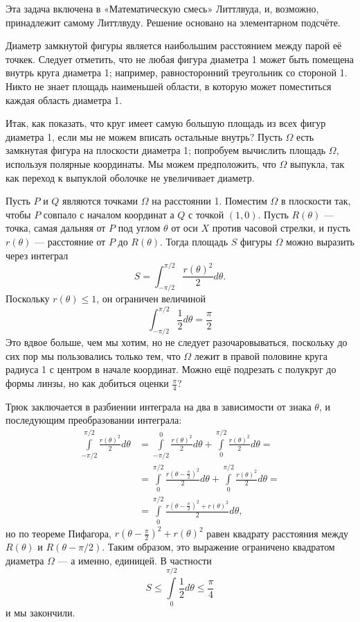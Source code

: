 Эта задача включена в «Математическую смесь» Литтлвуда, и, возможно, принадлежит самому Литтлвуду.
Решение основано на элементарном подсчёте. %

Диаметр замкнутой фигуры является наибольшим расстоянием между парой её точкек.
Следует отметить, что не любая фигура диаметра 1 может быть помещена внутрь круга диаметра 1;
например, равносторонний треугольник со стороной 1.
Никто не знает площадь наименьшей области, в которую может поместиться каждая область диаметра 1. %

Итак, как показать, что круг имеет самую большую площадь из всех фигур диаметра 1, если мы не можем вписать остальные внутрь?
Пусть $\Omega$ есть замкнутая фигура на плоскости диаметра 1; попробуем вычислить площадь $\Omega$, используя полярные координаты.
Мы можем предположить, что $\Omega$ выпукла, так как переход к выпуклой оболочке не увеличивает диаметр.

Пусть $P$ и $Q$ являются точками $\Omega$ на расстоянии 1.
Поместим $\Omega$ в плоскости так, чтобы $P$ совпало с началом координат а $Q$ с точкой $(1,0)$.
Пусть $R(\theta)$ --- точка, самая дальняя от $P$ под углом $\theta$ от оси $X$ против часовой стрелки, и пусть $r(\theta)$ --- расстояние от $P$ до $R(\theta)$.
Тогда площадь $S$ фигуры $\Omega$ можно выразить через интеграл
\[S=\int_{-\pi/2}^{\pi/2}\frac{r(\theta)^2}{2}d\theta.\]
Поскольку $r(\theta) \le 1$, он ограничен величиной
\[\int_{-\pi/2}^{\pi/2}\frac{1}{2}d\theta=\frac\pi2\]
Это вдвое больше, чем мы хотим, но не следует разочаровываться, поскольку до сих пор мы пользовались только тем, что $\Omega$ лежит в правой половине круга радиуса 1 с центром в начале координат.
Можно ещё подрезать с полукруг до формы линзы, но как добиться оценки $\tfrac\pi4$?

Трюк заключается в разбиении интеграла на два в зависимости от знака $\theta$, и последующим преобразовании интеграла:
\begin{align*}
\int\limits_{-\pi/2}^{\pi/2}\frac{r(\theta)^2}{2}d\theta&=\int\limits_{-\pi/2}^{0}\frac{r(\theta)^2}{2}d\theta+\int\limits_{0}^{\pi/2}\frac{r(\theta)^2}{2}d\theta=
\\
&=\int\limits_{0}^{\pi/2}\frac{r(\theta-\tfrac\pi2)^2}{2}d\theta+\int\limits_{0}^{\pi/2}\frac{r(\theta)^2}{2}d\theta=
\\
&=\int\limits_{0}^{\pi/2}\frac{r(\theta-\tfrac\pi2)^2+r(\theta)^2}{2}d\theta,
\end{align*}
но по теореме Пифагора, $r(\theta-\tfrac\pi2)^2+r(\theta)^2$ равен квадрату расстояния между $R(\theta)$ и $R(\theta- \pi/2)$.
Таким образом, это выражение ограничено квадратом диаметра $\Omega$ --- а именно, единицей.
В частности
\[S\le \int\limits_{0}^{\pi/2}\frac12d\theta\le\frac\pi4\]
и мы закончили.
\heart

